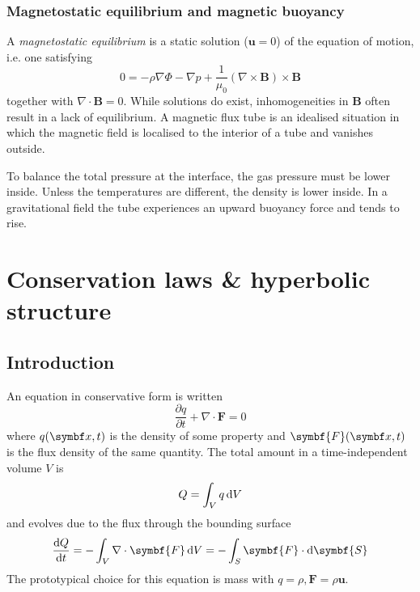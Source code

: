 \documentclass{jknotes}
\newcommand{\B}{\symbf{B}}
\renewcommand{\u}{\symbf{u}}
\begin{document}
\subsubsection{Magnetostatic equilibrium and magnetic buoyancy}
A \emph{magnetostatic equilibrium} is a static solution ($\u = 0$) of the
equation of motion, i.e. one satisfying
\begin{equation}
	0 = - \rho \nabla \Phi - \nabla p + \frac{1}{\mu_0} (\nabla \times \B)
	\times \B
\end{equation}
together with $\nabla \cdot \B = 0$. While solutions do exist, inhomogeneities
in $\B$ often result in a lack of equilibrium. A magnetic flux tube is an
idealised situation in which the magnetic field is localised to the interior
of a tube and vanishes outside.
\begin{center}
\end{center}

To balance the total pressure at the interface, the gas pressure must be lower
inside. Unless the temperatures are different, the density is lower inside. In
a gravitational field the tube experiences an upward buoyancy force and tends
to rise.

\section{Conservation laws \& hyperbolic structure}
\subsection{Introduction}
An equation in conservative form is written
\begin{equation}
	\frac{\partial q}{\partial t} + \nabla \cdot \symbf{F} = 0
\end{equation}
where $q(\x,t)$ is the density of some property and $\symbf{F}(\x,t)$ is the
flux density of the same quantity. The total amount in a time-independent
volume $V$ is
\begin{equation}
	Q = \int_V q \, \diffd V
\end{equation}
and evolves due to the flux through the bounding surface
\begin{equation}
	\frac{\diffd Q}{\diffd t} = - \int_V \nabla \cdot \symbf{F} \, \diffd V =
	- \int_S \symbf{F} \cdot \diffd \symbf{S}
\end{equation}
The prototypical choice for this equation is mass with $q = \rho, \symbf{F} =
\rho \u$. 
\end{document}
